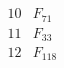 \documentclass{article}
\begin{document}
{$$\begin{array}{|r|*{7}{r|}}
\\
\hline
10 
 &  F_{71}&
 & 
 & 
 & 
 & 
 & 
\\
\hline
11 
 &F_{33}  &
 & 
 & 
 & 
 & 
 & 
\\
\hline
12 
 & F_{118} &
 & 
 & 
 & 

\end{array}$$}
\end{document}
